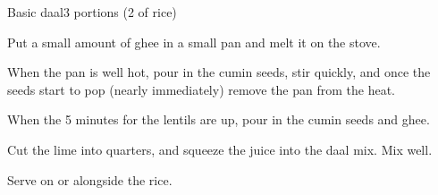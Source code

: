 \documentclass{article}
\begin{document}
\begin{recipe}{Basic daal}{3 portions (2 of rice)}
\begin{step}
\begin{stepdesc}
      \end{stepdesc}
    \end{step}
    \begin{step}
      \begin{ingrs}
      \end{ingrs}
      \begin{stepdesc}
        Put a small amount of ghee in a small pan and melt it on the stove.
      \end{stepdesc}
    \end{step}
    \begin{step}
      \begin{ingrs}
      \end{ingrs}
      \begin{stepdesc}
        When the pan is well hot, pour in the cumin seeds, stir quickly, and once the seeds start to pop (nearly immediately) remove the pan from the heat.
      \end{stepdesc}
    \end{step}
    \begin{step}
      \begin{ingrs}
      \end{ingrs}
      \begin{stepdesc}
        When the 5 minutes for the lentils are up, pour in the cumin seeds and ghee.
      \end{stepdesc}
    \end{step}
    \begin{step}
      \begin{ingrs}
      \end{ingrs}
      \begin{stepdesc}
        Cut the lime into quarters, and squeeze the juice into the daal mix. Mix well.
      \end{stepdesc}
    \end{step}
    \begin{step}
      \begin{ingrs}
      \end{ingrs}
      \begin{stepdesc}
        Serve on or alongside the rice.
      \end{stepdesc}
    \end{step}
  \end{recipe}
\end{document}
